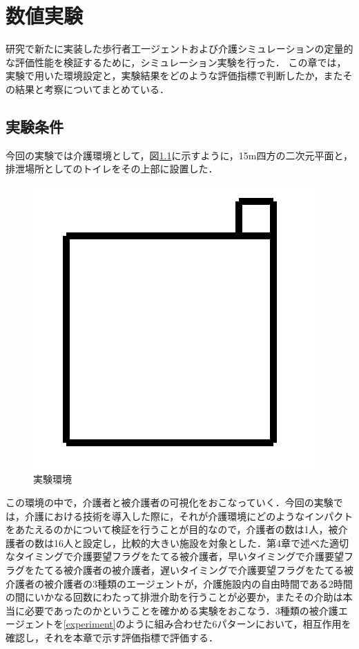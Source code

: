 \chapter{数値実験}

研究で新たに実装した歩行者工一ジェントおよび介護シミュレーションの定量的な評価性能を検証するために，シミュレーション実験を行った．
この章では，実験で用いた環境設定と，実験結果をどのような評価指標で判断したか，またその結果と考察についてまとめている．

\section{実験条件}

今回の実験では介護環境として，図\ref{environment}に示すように，15m四方の二次元平面と，排泄場所としてのトイレをその上部に設置した．

\begin{figure}[htb]
\begin{center}
 \includegraphics[scale=0.5]{figures/environment.png}
 \caption[実験環境]{実験環境 \label{environment}}
\end{center}
\end{figure}

この環境の中で，介護者と被介護者の可視化をおこなっていく．今回の実験では，介護における技術を導入した際に，それが介護環境にどのようなインパクトをあたえるのかについて検証を行うことが目的なので，介護者の数は1人，被介護者の数は16人と設定し，比較的大きい施設を対象とした．第4章で述べた適切なタイミングで介護要望フラグをたてる被介護者，早いタイミングで介護要望フラグをたてる被介護者の被介護者，遅いタイミングで介護要望フラグをたてる被介護者の被介護者の3種類のエージェントが，介護施設内の自由時間である2時間の間にいかなる回数にわたって排泄介助を行うことが必要か，またその介助は本当に必要であったのかということを確かめる実験をおこなう．3種類の被介護エージェントを\ref{experiment}のように組み合わせた6パターンにおいて，相互作用を確認し，それを本章で示す評価指標で評価する．

